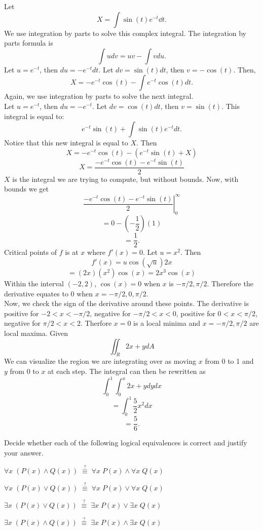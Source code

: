 \documentclass[11pt]{article}
\begin{document}
\begin{solution}
\begin{Parts}
\Part Let 
$$X = \int \sin(t)e^{-t} \dd{t}.$$
We use integration by parts to solve this complex integral. 
The integration by parts formula is
$$\int udv=uv-\int vdu.$$
Let $u=e^{-t}$, then $du=-e^{-t}dt$.
Let $dv=\sin(t)dt$, then $v=-\cos(t)$.
Then,
$$X=-e^{-t}\cos(t)-\int e^{-t}\cos(t)dt.$$
Again, we use integration by parts to solve the next integral.\\
Let $u=e^{-t}$, then $du=-e^{-t}$.
Let $dv=\cos(t)dt$, then $v=\sin(t)$. This integral is equal to:
$$e^{-t}\sin(t)+\int\sin(t)e^{-t}dt.$$
Notice that this new integral is equal to $X$.
Then
$$X=-e^{-t}\cos(t)-(e^{-t}\sin(t)+X)$$
$$X=\frac{-e^{-t}\cos(t)-e^{-t}\sin(t)}{2}$$
$X$ is the integral we are trying to compute, but without bounds. Now, with bounds we get
$$\left.\frac{-e^{-t}\cos(t)-e^{-t}\sin(t)}{2}\right|_0^\infty$$
$$= 0-(-\frac{1}{2})(1)$$
$$=\boxed{\frac{1}{2}}.$$
\Part Critical points of $f$ is at $x$ where $f'(x)=0$.
Let $u=x^2$. Then
$$f'(x)=u\cos(\sqrt{u})2x$$
$$=(2x)(x^2)\cos(x)=2x^3\cos(x)$$
Within the interval $(-2,2)$, $\cos(x)=0$ when $x$ is $-\pi/2, \pi/2$.
Therefore the derivative equates to 0 when $x=-\pi/2,0,\pi/2$.
\\Now, we check the sign of the derivative around these points.
The derivative is 
positive for $-2<x<-\pi/2$,
negative for $-\pi/2<x<0$,
positive for $0<x<\pi/2$,
negative for $\pi/2<x<2$.
Therfore $x=0$ is a local minima and $x=-\pi/2,\pi/2$ are local maxima.
\Part 
Given 
$$\iint_R2x+ydA$$
We can visualize the region we are integrating over 
as moving $x$ from 0 to 1 and $y$ from 0 to $x$ at each step. The integral can then be rewritten as
$$\int_0^1\int_0^x2x+ydydx$$
$$=\int_{0}^{1}\frac{5}{2}x^{2}dx$$
$$=\boxed{\frac{5}{6}}.$$




\end{Parts}
\end{solution}

\newpage {}

Decide whether each of the following logical equivalences is correct and justify your answer. 

\begin{Parts}
    \Part $\forall x \; \left( P(x) \land Q(x) \right) \;\overset{?}{\equiv}\; \forall x \; P(x) \land \forall x \; Q(x)$
    
    \Part $\forall x \; \left( P(x) \lor Q(x) \right) \;\overset{?}{\equiv}\; \forall x \; P(x) \lor \forall x \; Q(x)$
    
    \Part $\exists x \; \left( P(x) \lor Q(x) \right) \;\overset{?}{\equiv}\; \exists x \; P(x) \lor \exists x \; Q(x)$
    
    \Part $\exists x \; \left( P(x) \land Q(x) \right) \;\overset{?}{\equiv}\; \exists x \; P(x) \land \exists x \; Q(x)$
    
\end{Parts}
\end{document}
